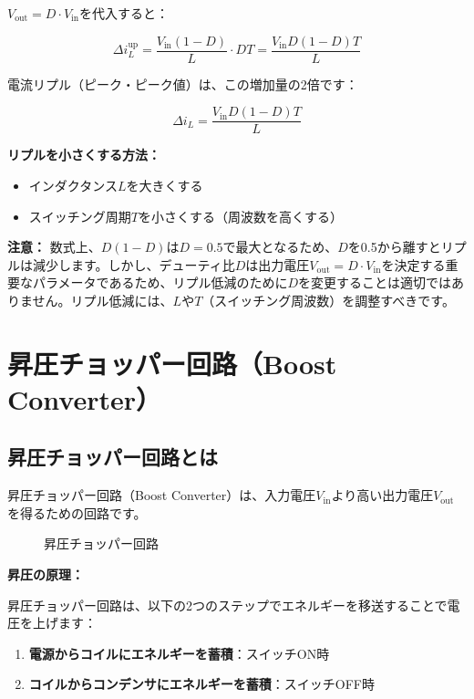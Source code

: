 $V_{\text{out}} = D \cdot V_{\text{in}}$を代入すると：

\begin{equation}
\Delta i_L^{\text{up}} = \frac{V_{\text{in}}(1-D)}{L} \cdot DT = \frac{V_{\text{in}}D(1-D)T}{L}
\end{equation}

電流リプル（ピーク・ピーク値）は、この増加量の2倍です：

\begin{equation}
\boxed{\Delta i_L = \frac{V_{\text{in}}D(1-D)T}{L}}
\end{equation}

\textbf{リプルを小さくする方法：}

\begin{itemize}
\item インダクタンス$L$を大きくする
\item スイッチング周期$T$を小さくする（周波数を高くする）
\end{itemize}

\textbf{注意：} 数式上、$D(1-D)$は$D=0.5$で最大となるため、$D$を0.5から離すとリプルは減少します。しかし、デューティ比$D$は出力電圧$V_{\text{out}} = D \cdot V_{\text{in}}$を決定する重要なパラメータであるため、リプル低減のために$D$を変更することは適切ではありません。リプル低減には、$L$や$T$（スイッチング周波数）を調整すべきです。

\section{昇圧チョッパー回路（Boost Converter）}

\subsection{昇圧チョッパー回路とは}

昇圧チョッパー回路（Boost Converter）は、入力電圧$V_{\text{in}}$より高い出力電圧$V_{\text{out}}$を得るための回路です。

\begin{figure}[H]
\centering
{}
\caption{昇圧チョッパー回路}
\label{fig:ch05_boost_converter}
\end{figure}

\textbf{昇圧の原理：}

昇圧チョッパー回路は、以下の2つのステップでエネルギーを移送することで電圧を上げます：

\begin{enumerate}
\item \textbf{電源からコイルにエネルギーを蓄積}：スイッチON時
\item \textbf{コイルからコンデンサにエネルギーを蓄積}：スイッチOFF時
\end{enumerate}

